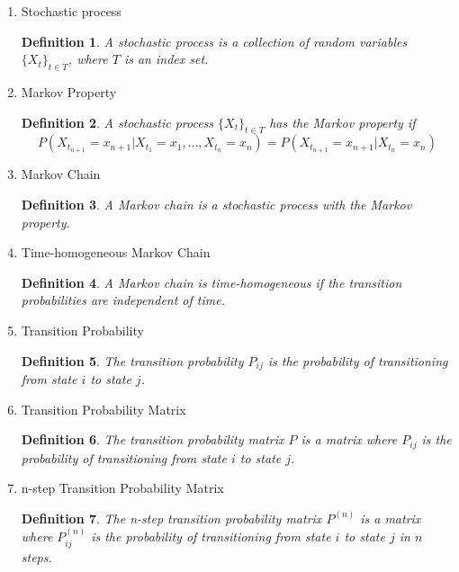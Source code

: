 \documentclass{article}
\newtheorem{definition}{Definition}[section]
\begin{document}
\begin{enumerate}
  \item Stochastic process
        \begin{definition}
          A stochastic process is a collection of random variables
          $\{X_t\}_{t \in T}$, where $T$ is an index set.
        \end{definition}
  \item Markov Property
        \begin{definition}
          A stochastic process $\{X_t\}_{t \in T}$ has the Markov property if
          \begin{equation}
            P(X_{t_{n+1}} = x_{n+1} | X_{t_1} = x_1, \ldots, X_{t_n} = x_n) = P(X_{t_{n+1}} = x_{n+1} | X_{t_n} = x_n)
          \end{equation}
        \end{definition}
  \item Markov Chain
        \begin{definition}
          A Markov chain is a stochastic process with the Markov property.
        \end{definition}
  \item Time-homogeneous Markov Chain
        \begin{definition}
          A Markov chain is time-homogeneous if the transition probabilities are independent of time.
        \end{definition}
  \item Transition Probability
        \begin{definition}
          The transition probability $P_{ij}$ is the probability of transitioning from state $i$ to state $j$.
        \end{definition}
  \item Transition Probability Matrix
        \begin{definition}
          The transition probability matrix $P$ is a matrix
          where $P_{ij}$ is the probability of transitioning from state $i$ to state $j$.
        \end{definition}
  \item n-step Transition Probability Matrix
        \begin{definition}
          The n-step transition probability matrix $P^{(n)}$ is a matrix
          where $P^{(n)}_{ij}$ is the probability of transitioning from state $i$ to state $j$ in $n$ steps.


\end{definition}
\end{enumerate}
\end{document}

